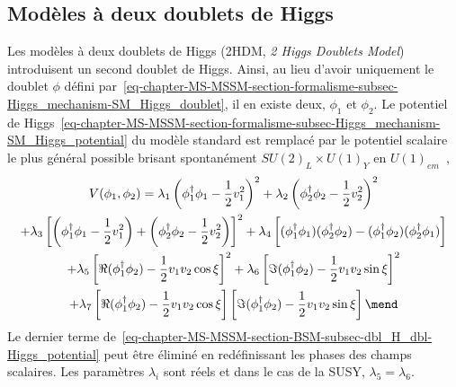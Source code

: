 \subsection{Modèles à deux doublets de Higgs}\label{chapter-MS-MSSM-section-BSM-subsec-dbl_H_dbl}
\par Les modèles à deux doublets de Higgs (2HDM, \emph{2 Higgs Doublets Model}) introduisent un second doublet de Higgs.
Ainsi, au lieu d'avoir uniquement le doublet $\phi$ défini par~\eqref{eq-chapter-MS-MSSM-section-formalisme-subsec-Higgs_mechanism-SM_Higgs_doublet}, il en existe deux, $\phi_1$ et $\phi_2$.
Le potentiel de Higgs~\eqref{eq-chapter-MS-MSSM-section-formalisme-subsec-Higgs_mechanism-SM_Higgs_potential} du modèle standard est remplacé par le potentiel scalaire le plus général possible brisant spontanément $SU(2)_L \times U(1)_Y$ en $U(1)_{em}$~\cite{Higgs_hunter_guide,Higgs_hunter_guide_errata},
\begin{multline}
V(\phi_1,\phi_2)
= \lambda_1 \left(\phi_1^\dagger\phi_1 - \frac{1}{2} v_1^2\right)^2
+ \lambda_2 \left(\phi_2^\dagger\phi_2 - \frac{1}{2} v_2^2\right)^2
\\
+ \lambda_3 \left[ \left(\phi_1^\dagger\phi_1 - \frac{1}{2} v_1^2\right) + \left(\phi_2^\dagger\phi_2 - \frac{1}{2} v_2^2\right) \right]^2
+ \lambda_4 \left[ (\phi_1^\dagger\phi_1)(\phi_2^\dagger\phi_2) - (\phi_1^\dagger\phi_2)(\phi_2^\dagger\phi_1) \vphantom{\frac{1}{2}}\right]
\\
+ \lambda_5 \left[ \Re(\phi_1^\dagger\phi_2) - \frac{1}{2} v_1v_2\cos\xi \right]^2
+ \lambda_6 \left[ \Im(\phi_1^\dagger\phi_2) - \frac{1}{2} v_1v_2\sin\xi \right]^2
\\
+ \lambda_7 \left[ \Re(\phi_1^\dagger\phi_2) - \frac{1}{2} v_1v_2\cos\xi \right]\left[ \Im(\phi_1^\dagger\phi_2) - \frac{1}{2} v_1v_2\sin\xi \right]
\mend
\label{eq-chapter-MS-MSSM-section-BSM-subsec-dbl_H_dbl-Higgs_potential}
\end{multline}
Le dernier terme de~\eqref{eq-chapter-MS-MSSM-section-BSM-subsec-dbl_H_dbl-Higgs_potential} peut être éliminé en redéfinissant les phases des champs scalaires.
Les paramètres $\lambda_i$ sont réels et dans le cas de la SUSY, $\lambda_5=\lambda_6$.
